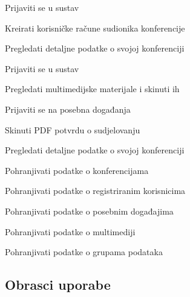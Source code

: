 \begin{packed_enum}
				\begin{packed_enum}

                         \item Prijaviti se u sustav	
					\item Kreirati korisničke račune sudionika konferencije
                        \item Pregledati detaljne podatke o svojoj konferenciji
					
				\end{packed_enum}
				
				\item  {}
				
				\begin{packed_enum}

                        
					\item Prijaviti se u sustav
					\item Pregledati multimedijske materijale i skinuti ih
					\item Prijaviti se na posebna događanja
					\item Skinuti PDF potvrdu o sudjelovanju
                        \item Pregledati detaljne podatke o svojoj konferenciji
					
				\end{packed_enum}
				
				\item  {}
				
				\begin{packed_enum}
					
					\item Pohranjivati podatke o konferencijama
					\item Pohranjivati podatke o registriranim korisnicima
                        \item Pohranjivati podatke o posebnim događajima
                        \item Pohranjivati podatke o multimediji
                        \item Pohranjivati podatke o grupama podataka
					
				\end{packed_enum}
			\end{packed_enum}
			
			\eject 
			
			
				
			\subsection{Obrasci uporabe}
				
